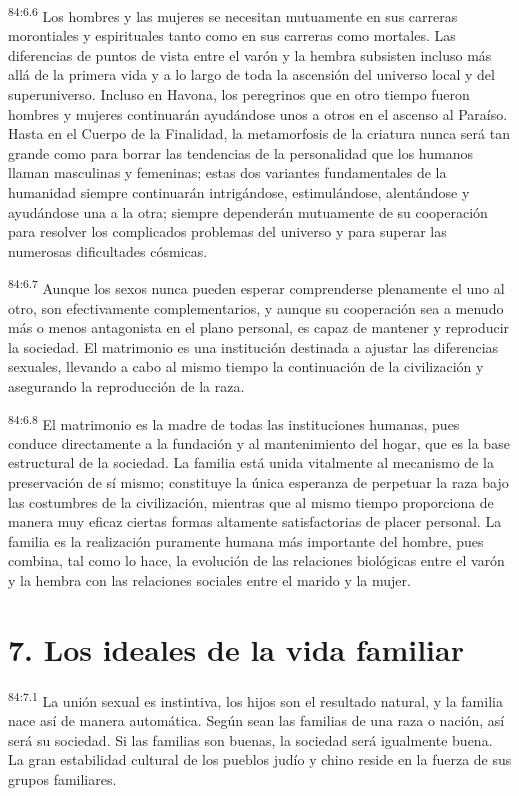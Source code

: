 \par
\textsuperscript{84:6.6} Los hombres y las mujeres se necesitan mutuamente en sus carreras morontiales y espirituales tanto como en sus carreras como mortales. Las diferencias de puntos de vista entre el varón y la hembra subsisten incluso más allá de la primera vida y a lo largo de toda la ascensión del universo local y del superuniverso. Incluso en Havona, los peregrinos que en otro tiempo fueron hombres y mujeres continuarán ayudándose unos a otros en el ascenso al Paraíso. Hasta en el Cuerpo de la Finalidad, la metamorfosis de la criatura nunca será tan grande como para borrar las tendencias de la personalidad que los humanos llaman masculinas y femeninas; estas dos variantes fundamentales de la humanidad siempre continuarán intrigándose, estimulándose, alentándose y ayudándose una a la otra; siempre dependerán mutuamente de su cooperación para resolver los complicados problemas del universo y para superar las numerosas dificultades cósmicas.

\par
\textsuperscript{84:6.7} Aunque los sexos nunca pueden esperar comprenderse plenamente el uno al otro, son efectivamente complementarios, y aunque su cooperación sea a menudo más o menos antagonista en el plano personal, es capaz de mantener y reproducir la sociedad. El matrimonio es una institución destinada a ajustar las diferencias sexuales, llevando a cabo al mismo tiempo la continuación de la civilización y asegurando la reproducción de la raza.

\par
\textsuperscript{84:6.8} El matrimonio es la madre de todas las instituciones humanas, pues conduce directamente a la fundación y al mantenimiento del hogar, que es la base estructural de la sociedad. La familia está unida vitalmente al mecanismo de la preservación de sí mismo; constituye la única esperanza de perpetuar la raza bajo las costumbres de la civilización, mientras que al mismo tiempo proporciona de manera muy eficaz ciertas formas altamente satisfactorias de placer personal. La familia es la realización puramente humana más importante del hombre, pues combina, tal como lo hace, la evolución de las relaciones biológicas entre el varón y la hembra con las relaciones sociales entre el marido y la mujer.

\section*{7. Los ideales de la vida familiar}
\par
\textsuperscript{84:7.1} La unión sexual es instintiva, los hijos son el resultado natural, y la familia nace así de manera automática. Según sean las familias de una raza o nación, así será su sociedad. Si las familias son buenas, la sociedad será igualmente buena. La gran estabilidad cultural de los pueblos judío y chino reside en la fuerza de sus grupos familiares.

